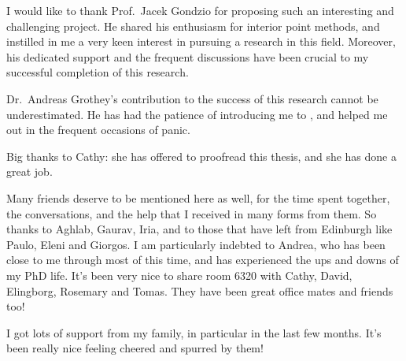 
%
%

I would like to thank Prof.~Jacek Gondzio for proposing such an
interesting and challenging project. 
He shared his enthusiasm for interior point methods, and 
instilled in me a very keen interest in pursuing a research in this field.
Moreover, his dedicated support and the frequent discussions
have been crucial to my successful
completion of this research.

Dr.~Andreas Grothey's contribution to the success of this research
cannot be underestimated. 
He has had the patience of introducing me to \OOPS, and helped me out
in the frequent occasions of panic.

Big thanks to Cathy: she has offered to proofread this thesis, and she
has done a great job. 

Many friends deserve to be mentioned here as well, for the time spent together,
the conversations, and the help that I received in many forms from them.
So thanks to Aghlab, Gaurav, Iria, and to those that have left from Edinburgh
like Paulo, Eleni and Giorgos. 
I am particularly indebted to Andrea, who has been close to me through
most of this time, and has experienced the ups and downs of my PhD life.
It's been very nice to share room 6320 with Cathy, David, Elingborg, Rosemary
and Tomas. They have been great office mates and
friends too!

I got lots of support from my family, in particular in the last few months.
It's been really nice feeling cheered and spurred by them!
